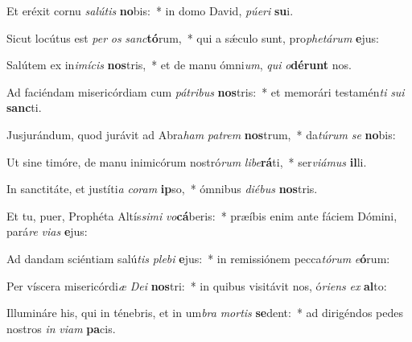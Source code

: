 \item Et eréxit cornu \textit{sa}\textit{lú}\textit{tis} \textbf{no}bis:~* in domo David, \textit{pú}\textit{e}\textit{ri} \textbf{su}i.
\item Sicut locútus est \textit{per} \textit{os} \textit{sanc}\textbf{tó}rum,~* qui a sǽculo sunt, pro\textit{phe}\textit{tá}\textit{rum} \textbf{e}jus:
\item Salútem ex in\textit{i}\textit{mí}\textit{cis} \textbf{nos}tris,~* et de manu ómni\textit{um}, \textit{qui} \textit{o}\textbf{dé}\textbf{runt} nos.
\item Ad faciéndam misericórdiam cum \textit{pá}\textit{tri}\textit{bus} \textbf{nos}tris:~* et memorári testamén\textit{ti} \textit{su}\textit{i} \textbf{sanc}ti.
\item Jusjurándum, quod jurávit ad Abra\textit{ham} \textit{pa}\textit{trem} \textbf{nos}trum,~* da\textit{tú}\textit{rum} \textit{se} \textbf{no}bis:
\item Ut sine timóre, de manu inimicórum nostró\textit{rum} \textit{li}\textit{be}\textbf{rá}ti,~* ser\textit{vi}\textit{á}\textit{mus} \textbf{il}li.
\item In sanctitáte, et justíti\textit{a} \textit{co}\textit{ram} \textbf{ip}so,~* ómnibus \textit{di}\textit{é}\textit{bus} \textbf{nos}tris.
\item Et tu, puer, Prophéta Altís\textit{si}\textit{mi} \textit{vo}\textbf{cá}beris:~* præíbis enim ante fáciem Dómini, pará\textit{re} \textit{vi}\textit{as} \textbf{e}jus:
\item Ad dandam sciéntiam salú\textit{tis} \textit{ple}\textit{bi} \textbf{e}jus:~* in remissiónem pecca\textit{tó}\textit{rum} \textit{e}\textbf{ó}rum:
\item Per víscera misericórdi\textit{æ} \textit{De}\textit{i} \textbf{nos}tri:~* in quibus visitávit nos, ó\textit{ri}\textit{ens} \textit{ex} \textbf{al}to:
\item Illumináre his, qui in ténebris, et in um\textit{bra} \textit{mor}\textit{tis} \textbf{se}dent:~* ad dirigéndos pedes nostros \textit{in} \textit{vi}\textit{am} \textbf{pa}cis.
